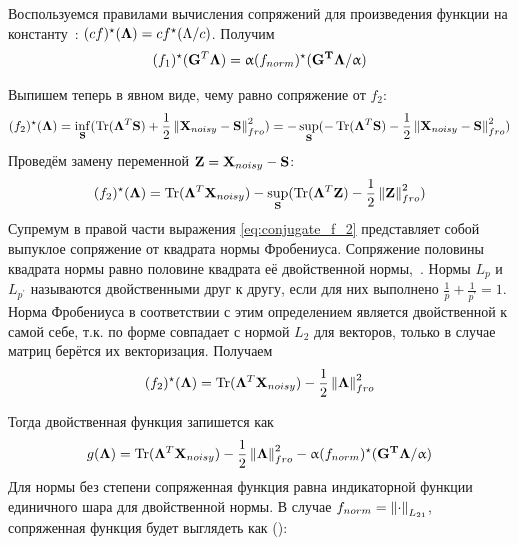 Воспользуемся правилами вычисления сопряжений для произведения функции на
константу~\cite{Boyd2004}: $(c f)^{\star}(\mathbf{\Lambda}) = c f^{\star}(\Lambda
/ c)$. Получим
\begin{equation}
    (f_1)^{\star}(\mathbf{G}^T\mathbf{\Lambda}) =
    \upalpha (f_{norm})^{\star}(\mathbf{G^T\Lambda}/\upalpha)
\end{equation}

Выпишем теперь в явном виде, чему равно сопряжение от $f_2$:
\begin{equation*}
    (f_2)^{\star}(\mathbf{\Lambda}) =
    \inf_{\mathbf{S}}(\operatorname*{Tr}(\mathbf{\Lambda}^T\mathbf{S}) + \frac{1}{2}\left\lVert\mathbf{X}_{noisy} - \mathbf{S}\right\rVert_{fro}^2) =
    - \sup_{\mathbf{S}}(- \operatorname*{Tr}(\mathbf{\Lambda}^T\mathbf{S}) - \frac{1}{2}\left\lVert\mathbf{X}_{noisy} - \mathbf{S}\right\rVert_{fro}^2)
\end{equation*}
Проведём замену переменной $\mathbf{Z} = \mathbf{X}_{noisy} - \mathbf{S}$:
\begin{equation}
    (f_2)^{\star}(\mathbf{\Lambda}) =
    \operatorname*{Tr}(\mathbf{\Lambda}^T\mathbf{X}_{noisy}) - \sup_{\mathbf{S}}(\operatorname*{Tr}(\mathbf{\Lambda}^T\mathbf{Z}) - \frac{1}{2}\left\lVert\mathbf{Z}\right\rVert_{fro}^2)
    \label{eq:conjugate_f_2}
\end{equation}
Супремум в правой части выражения \ref{eq:conjugate_f_2} представляет собой выпуклое сопряжение
от квадрата нормы Фробениуса. Сопряжение половины квадрата нормы равно половине квадрата её двойственной нормы,~\cite{Boyd2004, Gramfort2012}.
Нормы $L_p$ и $L_{p^{\prime}}$ называются двойственными друг к другу, если для них выполнено $\frac{1}{p} + \frac{1}{p^{\prime}} = 1$.
Норма Фробениуса в соответствии с этим определением является двойственной к самой себе, т.к. по форме совпадает с нормой $L_2$ для векторов, только в
случае матриц берётся их векторизация. Получаем
\begin{equation}
    (f_2)^{\star}(\mathbf{\Lambda}) =
    \operatorname*{Tr}(\mathbf{\Lambda}^T\mathbf{X}_{noisy}) - \frac{1}{2}\left\lVert\mathbf{\Lambda}\right\rVert^2_{fro}
\end{equation}

Тогда двойственная функция запишется как 
\begin{equation}
    g(\mathbf{\Lambda}) =
    \operatorname*{Tr}(\mathbf{\Lambda}^T\mathbf{X}_{noisy}) - \frac{1}{2}\left\lVert\mathbf{\Lambda}\right\rVert^2_{fro} - \upalpha (f_{norm})^{\star}(\mathbf{G^T\Lambda}/\upalpha)
    \label{eq:dual_func}
\end{equation}
Для нормы без степени сопряженная функция равна индикаторной функции единичного шара для двойственной нормы.
В случае $f_{norm} = \left\lVert\cdot\right\rVert_{L_{21}}$, сопряженная функция будет выглядеть как (\cite{Gramfort2012}):

